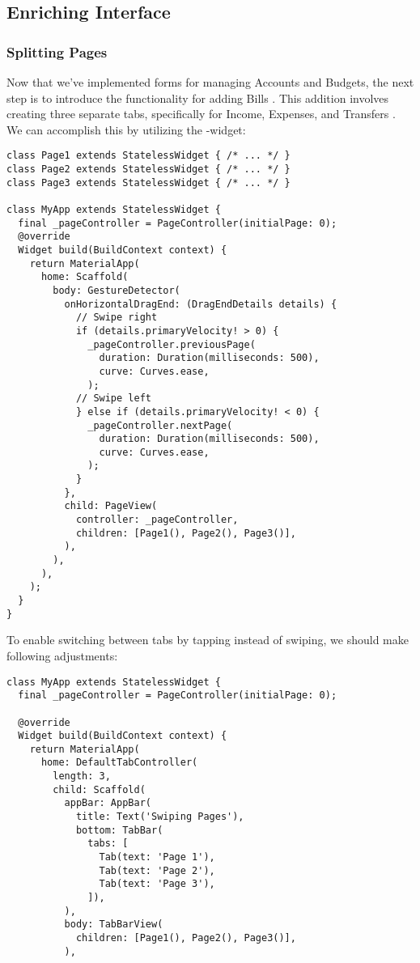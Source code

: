 
\subsection{Enriching Interface}

\subsubsection{Splitting Pages}

Now that we've implemented forms for managing Accounts and Budgets, the next step is to introduce the functionality 
for adding Bills . This addition involves creating three separate tabs, specifically for Income, Expenses, 
and Transfers . We can accomplish this by utilizing the -widget:

\begin{lstlisting}
class Page1 extends StatelessWidget { /* ... */ }
class Page2 extends StatelessWidget { /* ... */ }
class Page3 extends StatelessWidget { /* ... */ }

class MyApp extends StatelessWidget {
  final _pageController = PageController(initialPage: 0);
  @override
  Widget build(BuildContext context) {
    return MaterialApp(
      home: Scaffold(
        body: GestureDetector(
          onHorizontalDragEnd: (DragEndDetails details) {
            // Swipe right
            if (details.primaryVelocity! > 0) { 
              _pageController.previousPage(
                duration: Duration(milliseconds: 500),
                curve: Curves.ease,
              );
            // Swipe left
            } else if (details.primaryVelocity! < 0) { 
              _pageController.nextPage(
                duration: Duration(milliseconds: 500),
                curve: Curves.ease,
              );
            }
          },
          child: PageView(
            controller: _pageController,
            children: [Page1(), Page2(), Page3()],
          ),
        ),
      ),
    );
  }
}
\end{lstlisting}

\noindent To enable switching between tabs by tapping instead of swiping, we should make following adjustments:

\newpage
\begin{lstlisting}
class MyApp extends StatelessWidget {
  final _pageController = PageController(initialPage: 0);

  @override
  Widget build(BuildContext context) {
    return MaterialApp(
      home: DefaultTabController(
        length: 3,
        child: Scaffold(
          appBar: AppBar(
            title: Text('Swiping Pages'),
            bottom: TabBar(
              tabs: [
                Tab(text: 'Page 1'),
                Tab(text: 'Page 2'),
                Tab(text: 'Page 3'),
              ]),
          ),
          body: TabBarView(
            children: [Page1(), Page2(), Page3()],
          ),
\end{lstlisting}

